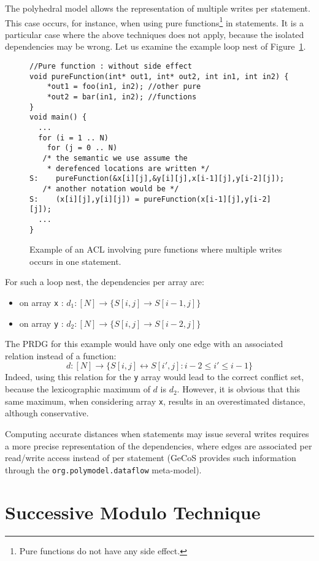 \documentclass{article}
\begin{document}
The polyhedral model allows the representation of multiple writes per statement.
This case occurs, for instance, when using pure functions\footnote{Pure
functions do not have any side effect.} in statements. It is a particular case
where the above techniques does not apply, because the isolated dependencies
may be wrong. Let us examine the example loop nest of
Figure~\ref{fig:example_multiwrites}.
\begin{figure}[ht!]
\begin{lstlisting}
//Pure function : without side effect
void pureFunction(int* out1, int* out2, int in1, int in2) {
	*out1 = foo(in1, in2); //other pure
	*out2 = bar(in1, in2); //functions
}
void main() {
  ...
  for (i = 1 .. N)
    for (j = 0 .. N)
   /* the semantic we use assume the  
    * derefenced locations are written */
S:    pureFunction(&x[i][j],&y[i][j],x[i-1][j],y[i-2][j]);
   /* another notation would be */
S:    (x[i][j],y[i][j]) = pureFunction(x[i-1][j],y[i-2][j]);
  ...
}
\end{lstlisting}
\caption{
Example of an ACL involving pure functions where multiple writes occurs in one
statement.
\label{fig:example_multiwrites}}
\end{figure}
For such a loop nest, the dependencies per array are: 
\begin{itemize}
  \item on array {\tt x} : $d_1 : [N] \rightarrow \{ S[i,j] \rightarrow S[i-1,j]
  \}$
  \item on array {\tt y} : $d_2 : [N] \rightarrow \{ S[i,j] \rightarrow S[i-2,j]
  \}$
\end{itemize}
The PRDG for this example would have only one edge with an associated relation
instead of a function:
$$d : [N] \rightarrow \{ S[i,j] \leftrightarrow S[i',j] : i-2 \le i' \le i-1
\}$$
Indeed, using this relation for the {\tt y} array would lead to the correct
conflict set, because the lexicographic maximum of $d$ is $d_2$. However, it is
obvious that this same maximum, when considering array {\tt x}, results in an
overestimated distance, although conservative.

Computing accurate distances when statements may issue several writes requires a
more precise representation of the dependencies, where edges are associated per
read/write access instead of per statement (GeCoS provides such information
through the {\tt org.polymodel.dataflow} meta-model).


{\center\noindent\makebox[\linewidth]{\rule{0.7\paperwidth}{0.4pt}}}
\section{Successive Modulo Technique}
\end{document}
